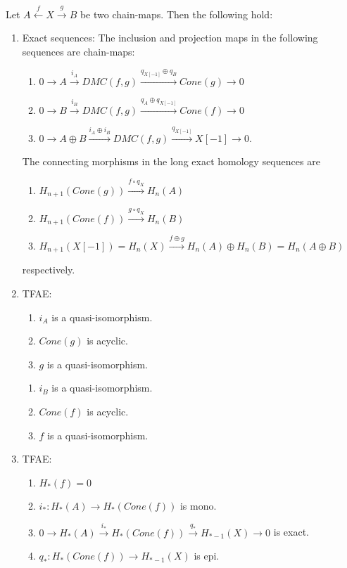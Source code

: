 \documentclass[fontsize=11pt,fleqn,a4paper]{scrartcl}
\begin{document}
\begin{theorem}
Let $A\xleftarrow{f} X \xrightarrow{g} B$ be two chain-maps. Then the following hold:
\begin{enumerate}
\item Exact sequences: The inclusion and projection maps in the following sequences are chain-maps:
\begin{enumerate}
\item $0 \to A \xrightarrow{i_A} DMC(f,g) \xrightarrow{q_{X[-1]}\oplus q_B} Cone(g) \to 0$
\item $0 \to B \xrightarrow{i_B} DMC(f,g) \xrightarrow{q_A\oplus q_{X[-1]}}  Cone(f) \to 0$
\item $0 \to A\oplus B \xrightarrow{i_A\oplus i_B} DMC(f,g) \xrightarrow{q_{X[-1]}} X[-1] \to 0$.
\end{enumerate}
The connecting morphisms in the long exact homology sequences are
\begin{enumerate}
\item $H_{n+1}(Cone(g)) \xrightarrow{f \circ q_X} H_n(A)$
\item $H_{n+1}(Cone(f)) \xrightarrow{g \circ q_X} H_n(B)$
\item $H_{n+1}(X[-1]) = H_n(X) \xrightarrow{f\oplus g} H_n(A)\oplus H_n(B) = H_n(A\oplus B)$
\end{enumerate}
respectively.
\item TFAE:

\begin{minipage}{0.49\linewidth}
\begin{enumerate}
\item $i_A$ is a quasi-isomorphism.
\item $Cone(g)$ is acyclic.
\item $g$ is a quasi-isomorphism.
\end{enumerate}
\end{minipage} \hfill \begin{minipage}{0.49\linewidth}
\begin{enumerate}
\item $i_B$ is a quasi-isomorphism.
\item $Cone(f)$ is acyclic.
\item $f$ is a quasi-isomorphism.
\end{enumerate}
\end{minipage}

\item TFAE:
\begin{enumerate}
\item $H_\ast(f)=0$
\item $i_\ast: H_\ast(A) \to H_\ast(Cone(f))$ is mono.
\item $0\to H_\ast(A) \xrightarrow{i_\ast} H_\ast(Cone(f)) \xrightarrow{q_\ast} H_{\ast-1}(X)\to 0$ is exact.
\item $q_\ast: H_\ast(Cone(f)) \to H_{\ast-1}(X)$ is epi.
\end{enumerate}
\end{enumerate}
\end{theorem}
\end{document}

